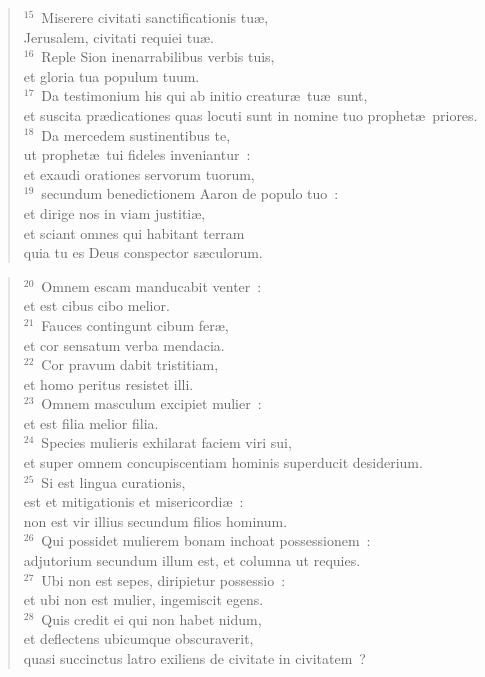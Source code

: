 \begin{flushleft}
\begin{verse}
${}^{15}$~Miserere civitati sanctificationis tu\ae ,\\ Jerusalem, civitati requiei tu\ae .\\
${}^{16}$~Reple Sion inenarrabilibus verbis tuis,\\ et gloria tua populum tuum.\\
${}^{17}$~Da testimonium his qui ab initio creatur\ae\ tu\ae\ sunt,\\ et suscita pr\ae dicationes quas locuti sunt in nomine tuo prophet\ae\ priores.\\
${}^{18}$~Da mercedem sustinentibus te,\\ ut prophet\ae\ tui fideles inveniantur~:\\ et exaudi orationes servorum tuorum,\\
${}^{19}$~secundum benedictionem Aaron de populo tuo~:\\ et dirige nos in viam justiti\ae ,\\ et sciant omnes qui habitant terram\\ quia tu es Deus conspector s\ae culorum.\end{verse}\end{flushleft}


\begin{flushleft}\begin{verse}${}^{20}$~Omnem escam manducabit venter~:\\ et est cibus cibo melior.\\
${}^{21}$~Fauces contingunt cibum fer\ae ,\\ et cor sensatum verba mendacia.\\
${}^{22}$~Cor pravum dabit tristitiam,\\ et homo peritus resistet illi.\\
${}^{23}$~Omnem masculum excipiet mulier~:\\ et est filia melior filia.\\
${}^{24}$~Species mulieris exhilarat faciem viri sui,\\ et super omnem concupiscentiam hominis superducit desiderium.\\
${}^{25}$~Si est lingua curationis,\\ est et mitigationis et misericordi\ae~:\\ non est vir illius secundum filios hominum.\\
${}^{26}$~Qui possidet mulierem bonam inchoat possessionem~:\\ adjutorium secundum illum est, et columna ut requies.\\
${}^{27}$~Ubi non est sepes, diripietur possessio~:\\ et ubi non est mulier, ingemiscit egens.\\
${}^{28}$~Quis credit ei qui non habet nidum,\\ et deflectens ubicumque obscuraverit,\\ quasi succinctus latro exiliens de civitate in civitatem~?\end{verse}\end{flushleft}


